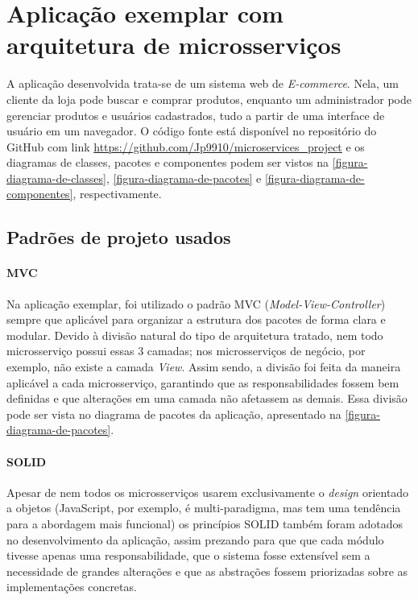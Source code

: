 \chapter{Aplicação exemplar com arquitetura de microsserviços}\label{chapter-aplicacao}



A aplicação desenvolvida trata-se de um sistema web de \emph{E-commerce}. Nela, um cliente da loja pode buscar e comprar produtos, enquanto um administrador pode gerenciar produtos e usuários cadastrados, tudo a partir de uma interface de usuário em um navegador.
O código fonte está disponível no repositório do GitHub com link \url{https://github.com/Jp9910/microservices_project} e
os diagramas de classes, pacotes e componentes podem ser vistos na \autoref{figura-diagrama-de-classes}, \autoref{figura-diagrama-de-pacotes} e \autoref{figura-diagrama-de-componentes}, respectivamente.

\section{Padrões de projeto usados}
\subsubsection*{MVC}
Na aplicação exemplar, foi utilizado o padrão MVC (\emph{Model-View-Controller}) sempre que aplicável para organizar a estrutura dos pacotes de forma clara e modular. Devido à divisão natural do tipo de arquitetura tratado, nem todo microsserviço possui essas 3 camadas; nos microsserviços de negócio, por exemplo, não existe a camada \emph{View}. Assim sendo, a divisão foi feita da maneira aplicável a cada microsserviço, garantindo que as responsabilidades fossem bem definidas e que alterações em uma camada não afetassem as demais. Essa divisão pode ser vista no diagrama de pacotes da aplicação, apresentado na \autoref{figura-diagrama-de-pacotes}.

\subsubsection*{SOLID}
Apesar de nem todos os microsserviços usarem exclusivamente o \emph{design} orientado a objetos (JavaScript, por exemplo, é multi-paradigma, mas tem uma tendência para a abordagem mais funcional) os princípios SOLID também foram adotados no desenvolvimento da aplicação, assim prezando para que 
que cada módulo tivesse apenas uma responsabilidade, que o sistema fosse extensível sem a necessidade de grandes alterações e que as abstrações fossem priorizadas sobre as implementações concretas.

